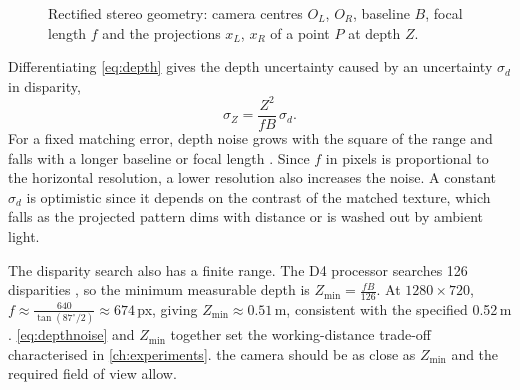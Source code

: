 \begin{figure}[htbp]
\centering
{}
\caption{Rectified stereo geometry: camera centres $O_L$, $O_R$, baseline $B$, focal length $f$ and the projections $x_L$, $x_R$ of a point $P$ at depth $Z$.}
\label{fig:stereo}
\end{figure}

Differentiating \autoref{eq:depth} gives the depth uncertainty caused by an uncertainty $\sigma_d$ in disparity,
\begin{equation}
\sigma_Z=\frac{Z^2}{fB}\,\sigma_d .
\label{eq:depthnoise}
\end{equation}
For a fixed matching error, depth noise grows with the square of the range and falls with a longer baseline or focal length \cite{keselmanIntelRRealSenseTMStereoscopic2017}. Since $f$ in pixels is proportional to the horizontal resolution, a lower resolution also increases the noise. A constant $\sigma_d$ is optimistic since it depends on the contrast of the matched texture, which falls as the projected pattern dims with distance or is washed out by ambient light.

The disparity search also has a finite range. The D4 processor searches 126 disparities \cite{grunnet-jepsenBestKnownMethodsTuningIntel}, so the minimum measurable depth is $Z_{\min}=\frac{fB}{126}$.
At $1280\times720$, $f\approx \frac{640}{\tan(87^\circ/2)}\approx 674$\,px, giving $Z_{\min}\approx 0.51$\,m, consistent with the specified 0.52\,m \cite{intel_d456}. \autoref{eq:depthnoise} and $Z_{\min}$ together set the working-distance trade-off characterised in \autoref{ch:experiments}. the camera should be as close as $Z_{\min}$ and the required field of view allow.

